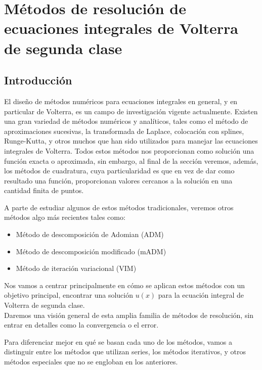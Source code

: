 \chapter{Métodos de resolución de ecuaciones integrales de Volterra de segunda clase}

\section{Introducción}
El diseño de métodos numéricos para ecuaciones integrales en general, y en particular de Volterra, es un campo de investigación vigente actualmente.
Existen una gran variedad de métodos numéricos y analíticos, tales como el método de aproximaciones sucesivas, la transformada de Laplace, colocación con splines, Runge-Kutta, y otros muchos que han sido utilizados para manejar las ecuaciones integrales de Volterra. Todos estos métodos nos proporcionan como solución una función exacta o aproximada, sin embargo, al final de la sección veremos, además, los métodos de cuadratura, cuya particularidad es que en vez de dar como resultado una función, proporcionan valores cercanos a la solución en una cantidad finita de puntos.

A parte de estudiar algunos de estos métodos tradicionales, veremos otros métodos algo más recientes tales como:
\begin{itemize}
	\item Método de descomposición de Adomian (ADM)
	\item Método de descomposición modificado (mADM)
	\item Método de iteración variacional (VIM)
\end{itemize}
Nos vamos a centrar principalmente en cómo se aplican estos métodos con un objetivo principal, encontrar una solución $u(x)$ para la ecuación integral de Volterra de segunda clase.\\Daremos una visión general de esta amplia familia de métodos de resolución, sin entrar en detalles como la convergencia o el error.

Para diferenciar mejor en qué se basan cada uno de los métodos, vamos a distinguir entre los métodos que utilizan series, los métodos iterativos, y otros métodos especiales que no se engloban en los anteriores.

